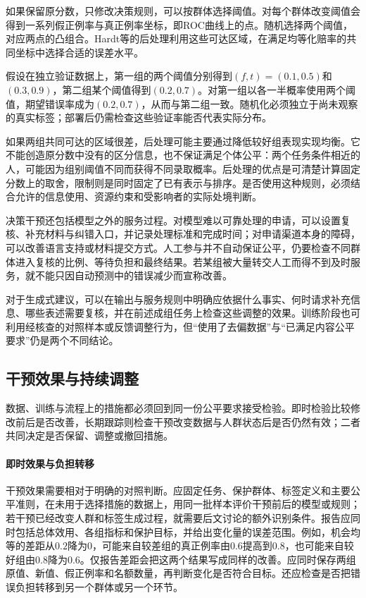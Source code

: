 如果保留原分数，只修改决策规则，可以按群体选择阈值。对每个群体改变阈值会得到一系列假正例率与真正例率坐标，即ROC曲线上的点。随机选择两个阈值，对应两点的凸组合。Hardt等的后处理利用这些可达区域，在满足均等化赔率的共同坐标中选择合适的误差水平。

\begin{example}[随机化如何补出共同错误率]
\label{ex:fairness-random-threshold}
假设在独立验证数据上，第一组的两个阈值分别得到$(f,t)=(0.1,0.5)$和$(0.3,0.9)$，第二组某个阈值得到$(0.2,0.7)$。对第一组以各一半概率使用两个阈值，期望错误率成为$(0.2,0.7)$，从而与第二组一致。随机化必须独立于尚未观察的真实标签；部署后仍需检查这些验证率能否代表实际分布。
\end{example}

如果两组共同可达的区域很差，后处理可能主要通过降低较好组表现实现均衡。它不能创造原分数中没有的区分信息，也不保证满足个体公平：两个任务条件相近的人，可能因为组别阈值不同而获得不同录取概率。后处理的优点是可清楚计算固定分数上的取舍，限制则是同时固定了已有表示与排序。是否使用这种规则，必须结合允许的信息使用、资源约束和受影响者的实际处境判断。

决策干预还包括模型之外的服务过程。对模型难以可靠处理的申请，可以设置复核、补充材料与纠错入口，并记录处理标准和完成时间；对申请渠道本身的障碍，可以改善语言支持或材料提交方式。人工参与并不自动保证公平，仍要检查不同群体进入复核的比例、等待负担和最终结果。若某组被大量转交人工而得不到及时服务，就不能只因自动预测中的错误减少而宣称改善。

对于生成式建议，可以在输出与服务规则中明确应依据什么事实、何时请求补充信息、哪些表述需要复核，并在前述成组任务上检查这些调整的效果。训练阶段也可利用经核查的对照样本或反馈调整行为，但“使用了去偏数据”与“已满足内容公平要求”仍是两个不同结论。

\subsection{干预效果与持续调整}
\label{sec:fairness-intervention-evaluation}
\label{sec:fairness-long-term}

数据、训练与流程上的措施都必须回到同一份公平要求接受检验。即时检验比较修改前后是否改善，长期跟踪则检查干预改变数据与人群状态后是否仍然有效；二者共同决定是否保留、调整或撤回措施。

\paragraph{即时效果与负担转移}

干预效果需要相对于明确的对照判断。应固定任务、保护群体、标签定义和主要公平准则，在未用于选择措施的数据上，用同一批样本评价干预前后的模型或规则；若干预已经改变人群和标签生成过程，就需要后文讨论的额外识别条件。报告应同时包括总体效用、各组指标和保护目标，并给出变化量的误差范围。例如，机会均等的差距从$0.2$降为0，可能来自较差组的真正例率由$0.6$提高到$0.8$，也可能来自较好组由$0.8$降为$0.6$。仅报告差距会把这两个结果写成同样的改善。应同时保存两组原值、新值、假正例率和名额数量，再判断变化是否符合目标。还应检查是否把错误负担转移到另一个群体或另一个环节。

